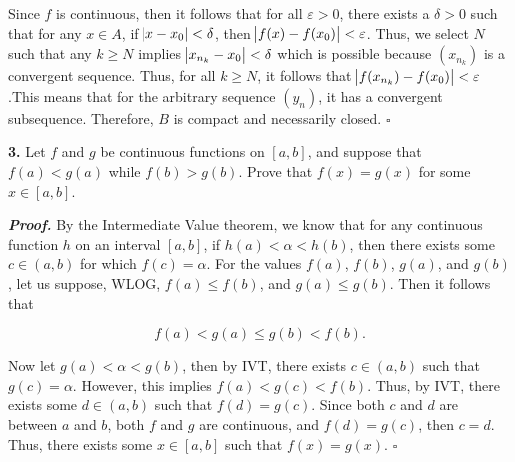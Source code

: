 \documentclass[12pt, a4paper]{article}
\begin{document}
\begin{description}
\begin{description}
        \newpage
        
        \item Since $f$ is continuous, then it follows that for all $\varepsilon>0$, there exists a $\delta>0$ such that for any $x\in A$, if $\abs{x-x_0}<\delta$, then $\abs{f(x)-f(x_0)}<\varepsilon$. Thus, we select $N$ such that any $k\geq N$ implies $\abs{x_{n_k}-x_0}<\delta$ which is possible because $(x_{n_k})$ is a convergent sequence. Thus, for all $k\geq N$, it follows that $\abs{f(x_{n_k})-f(x_0)}<\varepsilon$.This means that for the arbitrary sequence $(y_n)$, it has a convergent subsequence. Therefore, $B$ is compact and necessarily closed. $\square$
    \end{description}
    
\end{description}

\vspace{2mm}

\noindent\textbf{3.} Let $f$ and $g$ be continuous functions on $[a,b]$, and suppose that $f(a)<g(a)$ while $f(b)>g(b)$. Prove that $f(x)=g(x)$ for some $x\in[a,b]$.

\begin{description}
    \item\textit{\textbf{Proof.}} By the Intermediate Value theorem, we know that for any continuous function $h$ on an interval $[a,b]$, if $h(a)<\alpha<h(b)$, then there exists some $c\in(a,b)$ for which $f(c)=\alpha$. For the values $f(a)$, $f(b)$, $g(a)$, and $g(b)$, let us suppose, WLOG, $f(a)\leq f(b)$, and $g(a)\leq g(b)$. Then it follows that
    
    \begin{equation*}
        f(a)<g(a)\leq g(b)<f(b).
    \end{equation*}
    
\end{description}
\begin{description}
    
    \item Now let $g(a)<\alpha<g(b)$, then by IVT, there exists $c\in(a,b)$ such that $g(c)=\alpha$. However, this implies $f(a)<g(c)<f(b)$. Thus, by IVT, there exists some $d\in(a,b)$ such that $f(d)=g(c)$. Since both $c$ and $d$ are between $a$ and $b$, both $f$ and $g$ are continuous, and $f(d)=g(c)$, then $c=d$. Thus, there exists some $x\in[a,b]$ such that $f(x)=g(x)$.\hspace{85mm} $\square$
\end{description}
\end{document}
